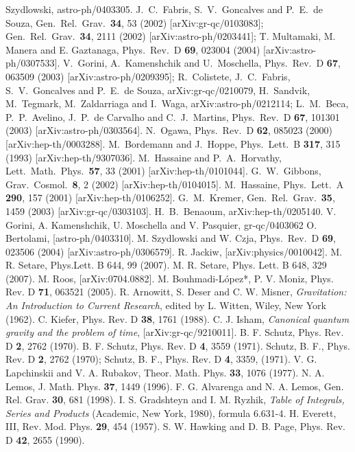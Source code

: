\begin{thebibliography}{100}
Szydlowski, astro-ph/0403305.
  J.~C.~Fabris, S.~V.~Goncalves and P.~E.~de Souza,
Gen.\ Rel.\ Grav.\  {\bf 34}, 53 (2002) [arXiv:gr-qc/0103083]; Gen.\ Rel.\ Grav.\  {\bf 34}, 2111 (2002) [arXiv:astro-ph/0203441]; T. Multamaki, M.
Manera and E.
Gaztanaga, %
Phys.\ Rev.\ D {\bf 69}, 023004 (2004) [arXiv:astro-ph/0307533].
  V.~Gorini, A.~Kamenshchik and U.~Moschella,
Phys.\ Rev.\ D {\bf67}, 063509 (2003)  [arXiv:astro-ph/0209395]; R.~Colistete, J.~C.~Fabris, S.~V.~Goncalves and P.~E.~de Souza, arXiv:gr-qc/0210079,
H.~Sandvik, M.~Tegmark, M.~Zaldarriaga and I.~Waga, arXiv:astro-ph/0212114; L.~M.~Beca, P.~P.~Avelino, J.~P.~de Carvalho and
C.~J.~Martins, %
Phys.\ Rev.\ D {\bf67}, 101301 (2003)  [arXiv:astro-ph/0303564].
  N.~Ogawa,
Phys.\ Rev.\ D {\bf62}, 085023 (2000)  [arXiv:hep-th/0003288].
 M.~Bordemann and J.~Hoppe,
Phys.\ Lett.\ B {\bf 317}, 315 (1993) [arXiv:hep-th/9307036].
  M.~Hassaine and P.~A.~Horvathy,
Lett.\ Math.\ Phys.\  {\bf 57}, 33 (2001) [arXiv:hep-th/0101044].
  G.~W.~Gibbons,
Grav.\ Cosmol.\  {\bf 8}, 2 (2002) [arXiv:hep-th/0104015].
  M.~Hassaine, %
Phys.\ Lett.\ A {\bf 290}, 157 (2001) [arXiv:hep-th/0106252].
  G.~M.~Kremer,
Gen.\ Rel.\ Grav.\ {\bf 35}, 1459 (2003) [arXiv:gr-qc/0303103].
  H.~B.~Benaoum,
arXiv:hep-th/0205140.
 V. Gorini, A. Kamenshchik, U. Moschella and V. Pasquier,
gr-qc/0403062
 O. Bertolami, [astro-ph/0403310].
 M. Szydlowski and W. Czja,
Phys.\ Rev.\ D {\bf 69}, 023506 (2004) [arXiv:astro-ph/0306579].
 R. Jackiw, [arXiv:physics/0010042].
M. R. Setare, Phys.Lett. B 644, 99 (2007).
M. R. Setare, Phys. Lett. B 648, 329 (2007).
M. Roos, [arXiv:0704.0882].
M. Bouhmadi-L\'{o}pez*, P. V. Moniz, Phys. Rev. D \textbf{71}, 063521
(2005).
 R. Arnowitt, S. Deser and C. W. Misner, {\it Gravitation:
An Introduction to Current Research}, edited by L. Witten, Wiley, New York (1962).
 C. Kiefer, Phys. Rev. D {\bf  38}, 1761 (1988).
 C. J. Isham, {\it Canonical quantum gravity and
the problem of time}, [arXiv:gr-qc/9210011].
 B. F. Schutz, Phys. Rev. D {\bf  2}, 2762 (1970).
 B. F. Schutz, Phys. Rev. D {\bf  4}, 3559 (1971).
 Schutz, B. F., Phys. Rev. D {\bf 2}, 2762 (1970);
Schutz, B. F., Phys. Rev. D {\bf 4}, 3359, (1971).
 V. G. Lapchinskii and V. A. Rubakov,
Theor. Math. Phys. {\bf 33}, 1076 (1977).
 N. A. Lemos, J. Math. Phys. {\bf 37}, 1449 (1996).
 F. G. Alvarenga and N. A. Lemos, Gen. Rel. Grav.
{\bf 30}, 681 (1998).
 I. S. Gradshteyn and I. M. Ryzhik, {\it Table of Integrals, Series and Products} (Academic, New York, 1980), formula 6.631-4.
 H. Everett, III, Rev. Mod. Phys. {\bf 29}, 454 (1957).
S. W. Hawking and D. B. Page, Phys. Rev. D \textbf{42}, 2655 (1990).
\end{thebibliography}
